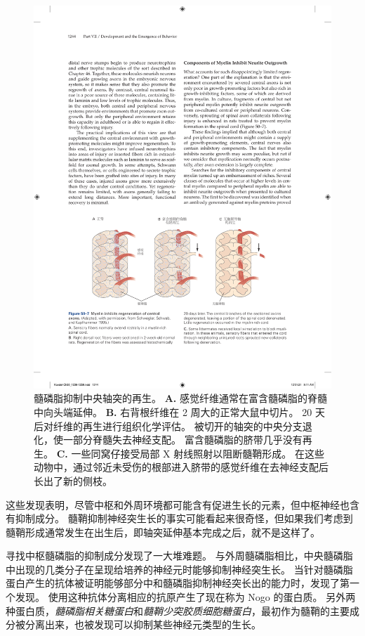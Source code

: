 \begin{figure}[htbp]
	\centering
	\includegraphics[width=0.9\linewidth]{chap50/fig_50_7}
	\caption{髓磷脂抑制中央轴突的再生\cite{schwegler1995increased}。
		\textbf{A.} 感觉纤维通常在富含髓磷脂的脊髓中向头端延伸。
		\textbf{B.} 右背根纤维在 2 周大的正常大鼠中切片。
		20 天后对纤维的再生进行组织化学评估。
		被切开的轴突的中央分支退化，使一部分脊髓失去神经支配。
		富含髓磷脂的脐带几乎没有再生。
		\textbf{C.} 一些同窝仔接受局部 X 射线照射以阻断髓鞘形成。
		在这些动物中，通过邻近未受伤的根部进入脐带的感觉纤维在去神经支配后长出了新的侧枝。}
	\label{fig:50_7}
\end{figure}


这些发现表明，尽管中枢和外周环境都可能含有促进生长的元素，但中枢神经也含有抑制成分。
髓鞘抑制神经突生长的事实可能看起来很奇怪，但如果我们考虑到髓鞘形成通常发生在出生后，即轴突延伸基本完成之后，就不是这样了。


寻找中枢髓磷脂的抑制成分发现了一大堆难题。
与外周髓磷脂相比，中央髓磷脂中出现的几类分子在呈现给培养的神经元时能够抑制神经突生长。
当针对髓磷脂蛋白产生的抗体被证明能够部分中和髓磷脂抑制神经突长出的能力时，发现了第一个发现。
使用这种抗体分离相应的抗原产生了现在称为 Nogo 的蛋白质。
另外两种蛋白质，\textit{髓磷脂相关糖蛋白}和\textit{髓鞘少突胶质细胞糖蛋白}，最初作为髓鞘的主要成分被分离出来，也被发现可以抑制某些神经元类型的生长。


